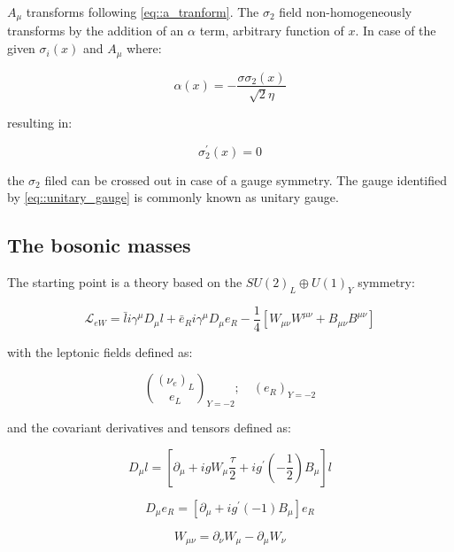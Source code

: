 $A_{\mu}$ transforms following \ref{eq::a_tranform}. The $\sigma_{2}$ field non-homogeneously transforms by the addition of an $\alpha$ term, arbitrary function of $x$. In case of the given $\sigma_{i}(x)$ and $A_{\mu}$ where:

\begin{equation}
\alpha(x) = -\dfrac{σ\sigma_{2}(x)}{\sqrt{2}\eta}
\end{equation}

resulting in:

\begin{equation}
\sigma^{\prime}_{2}(x) = 0
\label{eq::unitary_gauge}
\end{equation}

the $\sigma_{2}$ filed can be crossed out in case of a gauge symmetry. The gauge identified by \ref{eq::unitary_gauge} is commonly known as unitary gauge.

\subsection{The bosonic masses}

The starting point is a theory based on the $SU(2)_{L} \oplus U(1)_{Y}$ symmetry:

\begin{equation}
\mathcal{L}_{eW} = \bar{l}i\gamma^{\mu} D_{\mu}l + \bar{e}_{R}i\gamma^{\mu}D_{\mu}e_{R} - \dfrac{1}{4}[W_{\mu\nu}W^{\mu\nu} +B_{\mu\nu}B^{\mu\nu}]
\label{eq::lagrangian_ew}
\end{equation}

with the leptonic fields defined as:

\begin{equation}
\binom{(\nu_{e})_{L}}{e_{L}}_{Y=−2} ; \quad (e_{R})_{Y=−2}
\label{eq::fields_scheme}
\end{equation}

and the covariant derivatives and tensors defined as:

\begin{equation}
D_{\mu}l = [\partial_{\mu} + igW_{\mu} \dfrac{\tau}{2}  + ig^{\prime}(-\dfrac{1}{2})B_{\mu}]l 
\end{equation}

\begin{equation}
D_{\mu}e_{R} = [\partial_{\mu} + ig^{\prime}(-1)B_{\mu}]e_{R}
\end{equation}

\begin{equation}
W_{\mu\nu} =\partial_{\nu}W_{\mu} - \partial_{\mu}W_{\nu} 
\end{equation}

